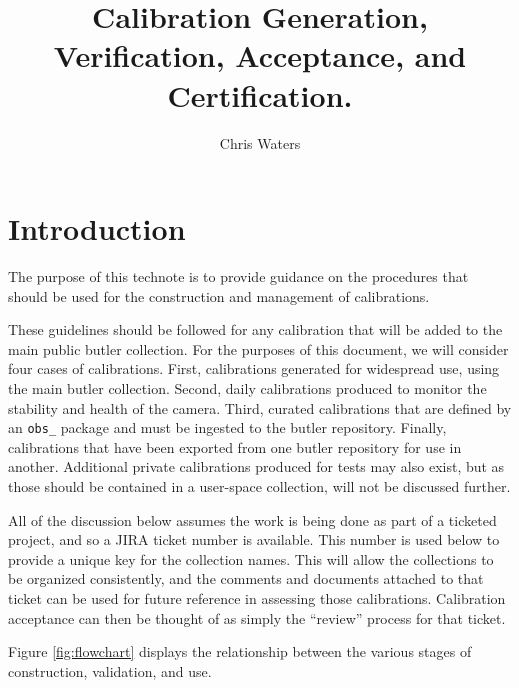 \documentclass[DM,authoryear,toc]{lsstdoc}
\title{Calibration Generation, Verification, Acceptance, and Certification.}
\author{%
Chris Waters
}
\date{\vcsDate}
\begin{document}
\maketitle


\section{Introduction}

The purpose of this technote is to provide guidance on the procedures that should be used for the construction and management of calibrations.

These guidelines should be followed for any calibration that will be added to the main public butler collection.  For the purposes of this document, we will consider four cases of calibrations.  First, calibrations generated for widespread use, using the main butler collection.  Second, daily calibrations produced to monitor the stability and health of the camera.  Third, curated calibrations that are defined by an \verb|obs_| package and must be ingested to the butler repository.  Finally, calibrations that have been exported from one butler repository for use in another.  Additional private calibrations produced for tests may also exist, but as those should be contained in a user-space collection, will not be discussed further.

All of the discussion below assumes the work is being done as part of a ticketed project, and so a JIRA ticket number is available.  This number is used below to provide a unique key for the collection names.  This will allow the collections to be organized consistently, and the comments and documents attached to that ticket can be used for future reference in assessing those calibrations.  Calibration acceptance can then be thought of as simply the ``review'' process for that ticket.

Figure \ref{fig:flowchart} displays the relationship between the various stages of construction, validation, and use.
\end{document}
